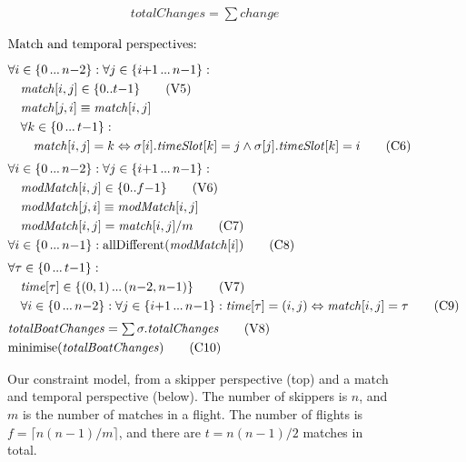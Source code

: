 \documentclass{llncs}
\newcommand{\match}{\mathit{match}}
\newcommand{\timeSlot}{\mathit{timeSlot}}
\newcommand{\change}{\mathit{change}}
\newcommand{\totalChanges}{\mathit{totalChanges}}
\newcommand{\totalBoatChanges}{\mathit{totalBoatChanges}}
\newcommand{\modMatch}{\mathit{modMatch}}
\newcommand{\timeVar}{\mathit{time}}
\newcommand{\allDifferent}{\mathrm{allDifferent}}
\newcommand{\minimise}{\mathrm{minimise}}
\newcommand\nldots{\,\hbox to 0.8em{.\hss.\hss.}\,}
\begin{document}
\begin{figure}[p]
\begin{framed}
\begin{align}
    & \totalChanges = \textstyle\sum \change \label{C5} \tag{C5}
\end{align}
\end{framed}\begin{framed}
\begin{align}
    \intertext{Match and temporal perspectives:\smallskip}
    & \forall i \in \{0 \nldots n{-}2\} : \forall j \in \{ i{+}1 \nldots n{-}1 \} : \nonumber \\
    & \hspace*{1em} \match[{i,j}] \in \{0..t{-}1\} \tag{V5} \label{V5} \\
    & \hspace*{1em} \match[{j,i}] \equiv \match[{i,j}] \nonumber \\
    & \hspace*{1em} \forall k \in \{0 \nldots t{-}1 \} : \nonumber \\
    & \hspace*{2em} \match[{i,j}] = k \Leftrightarrow \sigma[{i}].\timeSlot[{k}] = j \wedge \sigma[{j}].\timeSlot[{k}] = i \tag{C6} \label{C6} \\[0.1cm]
    & \forall i \in \{0 \nldots n{-}2\} : \forall j \in \{ i{+}1 \nldots n{-}1 \} \nonumber : \\
    & \hspace*{1em} \modMatch[{i,j}] \in \{0..f{-}1\} \label{V6} \tag{V6} \\
    & \hspace*{1em} \modMatch[{j,i}] \equiv \modMatch[{i,j}] \nonumber  \\
    & \hspace*{1em} \modMatch[{i,j}] = \match[{i,j}] / m \tag{C7} \label{C7} \\
    & \forall i \in \{0 \nldots n{-}1 \} : \allDifferent(\modMatch[{i}]) \tag{C8} \label{C8} \\[0.1cm]
    & \forall \tau \in \{0 \nldots t{-}1 \} : \nonumber \\
    & \hspace*{1em} \timeVar[{\tau}] \in \{(0,1) \nldots (n{-}2,n{-}1)\} \tag{V7} \label{V7} \\
    & \hspace*{1em} \forall i \in \{0 \nldots n{-}2\} : \forall  j \in \{ i{+}1 \nldots n{-}1 \} : \timeVar[{\tau}] = (i,j) \Leftrightarrow \match[{i,j}] = \tau \tag{C9} \label{C9} \\[0.1cm]
    & \totalBoatChanges = \textstyle\sum \sigma.\totalChanges \label{V8} \tag{V8} \\
    & \minimise(\totalBoatChanges) \label{C10} \tag{C10}
\end{align}
\end{framed}
\caption{Our constraint model, from a skipper perspective (top) and a match and
temporal perspective (below). The number of skippers is $n$, and $m$ is the
number of matches in a flight. The number of flights is $f = \lceil n(n-1)/m
\rceil$, and there are $t = n(n-1)/2$ matches in total.}\label{model:stage1}
\end{figure}
\end{document}
